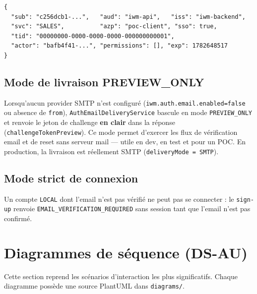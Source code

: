 \documentclass[11pt,a4paper,oneside]{report}
\newcommand{\code}[1]{\texttt{\small #1}}
\begin{document}
\begin{lstlisting}[caption={Exemple de payload d'access token (claims décodés).}]
{
  "sub": "c256dcb1-...",   "aud": "iwm-api",   "iss": "iwm-backend",
  "svc": "SALES",          "azp": "poc-client", "sso": true,
  "tid": "00000000-0000-0000-0000-000000000001",
  "actor": "bafb4f41-...", "permissions": [], "exp": 1782648517
}
\end{lstlisting}

\section{Mode de livraison PREVIEW\_ONLY}
Lorsqu'aucun provider SMTP n'est configuré (\code{iwm.auth.email.enabled=false} ou absence
de \code{from}), \code{AuthEmailDeliveryService} bascule en mode \code{PREVIEW\_ONLY} et
renvoie le jeton de challenge \textbf{en clair} dans la réponse (\code{challengeTokenPreview}).
Ce mode permet d'exercer les flux de vérification email et de reset sans serveur mail — utile
en dev, en test et pour un POC. En production, la livraison est réellement SMTP
(\code{deliveryMode = SMTP}).

\section{Mode strict de connexion}
Un compte \code{LOCAL} dont l'email n'est pas vérifié ne peut pas se connecter : le
\code{sign-up} renvoie \code{EMAIL\_VERIFICATION\_REQUIRED} sans session tant que l'email
n'est pas confirmé.

\chapter{Diagrammes de séquence (DS-AU)}
Cette section reprend les scénarios d'interaction les plus significatifs. Chaque diagramme
possède une source PlantUML dans \texttt{diagrams/}.

\newcommand{\dsfig}[2]{%
  \begin{figure}[h]\centering
  \fbox{\parbox{0.95\linewidth}{\centering\vspace{0.6cm}\itshape\color{rtgray}
  #2\\[3pt](\texttt{diagrams/#1.puml})\vspace{0.6cm}}}
  \caption{#2}\end{figure}}
\end{document}
